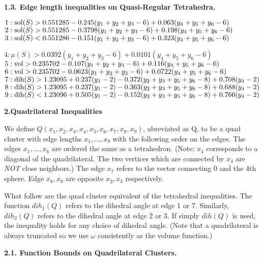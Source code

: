 {\bf 1.3. Edge length inequalities on Quasi-Regular Tetrahedra.}

\smallskip

$1: \operatorname{sol}(S) > 0.551285 - 0.245 (y_1+y_2+y_3-6) + 0.063 (y_4+y_5+y_6-6)$\newline
$2: \operatorname{sol}(S) > 0.551285 - 0.3798 (y_1+y_2+y_3-6) + 0.198 (y_4+y_5+y_6-6)$\newline
$3: \operatorname{sol}(S) < 0.551286 - 0.151 (y_1+y_2+y_3-6) + 0.323 (y_4+y_5+y_6-6)$\newline

$4: \mu(S) > 0.0392 (y_1+y_2+y_3-6) + 0.0101 (y_4+y_5+y_6-6) $\newline
$5: \operatorname{vol} > 0.235702 -0.107 (y_1+y_2+y_3-6) + 0.116 (y_4+y_5+y_6-6)$\newline
$6: \operatorname{vol} > 0.235702 -0.0623 (y_1+y_2+y_3-6) + 0.0722 (y_4+y_5+y_6-6)$\newline
$7: \operatorname{dih}(S) > 1.23095 + 0.237 (y_1-2) - 0.372 (y_2+y_3+y_5+y_6-8) + 0.708 (y_4-2) $\newline
$8: \operatorname{dih}(S) > 1.23095 + 0.237 (y_1-2) - 0.363 (y_2+y_3+y_5+y_6-8) + 0.688 (y_4-2)$\newline
$9: \operatorname{dih}(S) < 1.23096 + 0.505 (y_1-2) - 0.152(y_2+y_3+y_5+y_6-8) + 0.766 (y_4-2)$\newline



\smallskip

{\bf  2.Quadrilateral Inequalities}

\smallskip

We define $Q(x_1,x_2,x_3,x_4,x_5,x_6,x_7,x_8,x_9)$, abreviated as Q, to be a quad cluster with edge lengths $x_1,\dots, x_9$ with the following order on the edges.  The edges $x_1,\dots, x_6$ are ordered the same as a tetrahedron.  (Note: $x_4$ corresponds to a diagonal of the quadrilateral.  The two vertices which are connected by $x_4$ are {\sl NOT} close neighbors.) The edge $x_7$ refers to the vector connecting 0 and the 4th sphere.  Edge $x_8,x_9$ are opposite $x_2,x_3$ respectively.

What follow are the quad cluster equivalent of the tetrahedral inequalities.
The function $dih_1(Q)$ refers to the dihedral angle at edge 1 or 7.  Similarly, $dih_2(Q)$ refers to the dihedral angle at edge 2 or 3.  If simply $dih(Q)$ is used, the inequality holds for any choice of dihedral angle.  (Note that a quadrilateral is always truncated so we use $\omega$ consistently as the volume function.)

{\bf 2.1. Function Bounds on Quadrilateral Clusters.}

